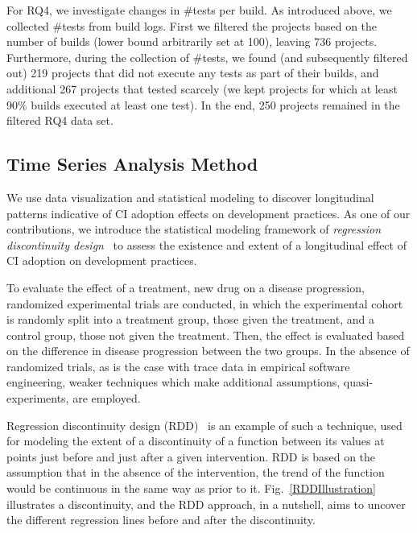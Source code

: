 For RQ4, we investigate changes in \#tests per build.
As introduced above, we collected \#tests from build logs. 
First we filtered the projects based on the number of builds
(lower bound arbitrarily set at 100), leaving 736 projects. 
Furthermore, during the collection of \#tests, we found (and subsequently
filtered out) 219 projects that did not execute any tests as part of their \Tvis 
builds, and additional 267 projects that tested scarcely (\ie we kept 
projects for which at least 90\% builds executed at least one test). 
In the end, 250 projects remained in the filtered RQ4 data set.

\subsection{Time Series Analysis Method}
\label{sec:tsa}

We use data visualization and statistical modeling to discover 
longitudinal patterns indicative of CI adoption effects on development practices.
As one of our contributions, we introduce the statistical modeling 
framework of \emph{regression discontinuity design}~\cite{imbens2008regression} 
to assess the existence and extent of a longitudinal effect of CI adoption on 
development practices.

To evaluate the effect of a treatment, \eg new drug on a disease progression, 
randomized experimental trials are conducted, 
in which the experimental 
cohort is randomly split into a treatment group, \ie those given the treatment, and 
a control group, \ie those not given the treatment. 
Then, the effect is evaluated based on the difference in disease progression 
between the two groups.
In the absence of randomized trials, as is the case with trace data in 
empirical software engineering, weaker techniques which make 
additional assumptions, \eg quasi-experiments, are employed.

Regression discontinuity design (RDD)~\cite{imbens2008regression} is an example of such a technique, 
used for modeling the extent of a discontinuity of a function between its values 
at points just before and just after a given intervention. 
RDD is based on the assumption that in the absence of the intervention, the 
trend of the function would be continuous in the same way as prior to it.
Fig.~\ref{RDDIllustration} illustrates a discontinuity, and the RDD approach, in a nutshell, aims to uncover the 
 different regression lines before and after the discontinuity.


